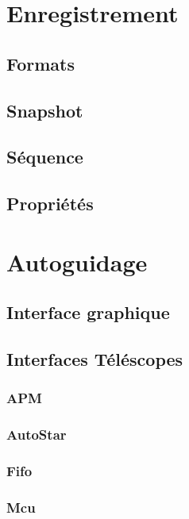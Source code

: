 \documentclass[11pt,a4paper]{book}
\begin{document}
\chapter{Enregistrement}

\section{Formats}

\section{Snapshot}

\section{S\'equence}

\section{Propri\'et\'es}

\chapter{Autoguidage}

\section{Interface graphique}

\section{Interfaces T\'el\'escopes}

\subsection{APM}

\subsection{AutoStar}

\subsection{Fifo}

\subsection{Mcu}
\end{document}
